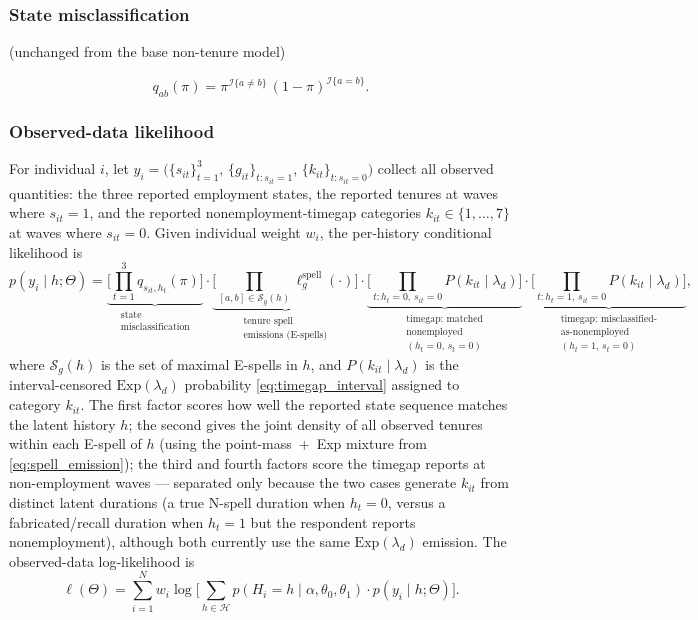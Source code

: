 \subsubsection{State misclassification} (unchanged from the base non-tenure model)

\begin{equation}
q_{ab}(\pi) = \pi^{\mathcal{I}\{a \neq b\}}\,(1-\pi)^{\mathcal{I}\{a=b\}}.
\end{equation}

\subsubsection{Observed-data likelihood}

For individual \(i\), let
\(y_i = \big(\{s_{it}\}_{t=1}^3,\, \{g_{it}\}_{t:s_{it}=1},\,
\{k_{it}\}_{t:s_{it}=0}\big)\) collect all observed quantities: the
three reported employment states, the reported tenures at waves where
\(s_{it}=1\), and the reported nonemployment-timegap categories
\(k_{it} \in \{1,\dots,7\}\) at waves where \(s_{it}=0\).
Given individual weight \(w_i\), the per-history conditional likelihood is
\begin{equation}
p(y_i \mid h; \Theta) =
\underbrace{\Big[\prod_{t=1}^3 q_{s_{it},h_t}(\pi)\Big]}_{\substack{\text{state}\\\text{misclassification}}} \cdot
\underbrace{\Big[\prod_{[a,b] \in \mathcal{S}_g(h)} \ell^{\mathrm{spell}}_g(\cdot)\Big]}_{\substack{\text{tenure spell}\\\text{emissions (E-spells)}}} \cdot
\underbrace{\Big[\prod_{t : h_t=0,\,s_{it}=0} P(k_{it} \mid \lambda_d)\Big]}_{\substack{\text{timegap: matched}\\\text{nonemployed}\\(h_t{=}0,\,s_t{=}0)}} \cdot
\underbrace{\Big[\prod_{t : h_t=1,\,s_{it}=0} P(k_{it} \mid \lambda_d)\Big]}_{\substack{\text{timegap: misclassified-}\\\text{as-nonemployed}\\(h_t{=}1,\,s_t{=}0)}},
\end{equation}
where \(\mathcal{S}_g(h)\) is the set of maximal E-spells in \(h\), and
\(P(k_{it} \mid \lambda_d)\) is the interval-censored
\(\mathrm{Exp}(\lambda_d)\) probability \eqref{eq:timegap_interval}
assigned to category \(k_{it}\). The first factor scores how well the
reported state sequence matches the latent history \(h\); the second
gives the joint density of all observed tenures within each E-spell of
\(h\) (using the point-mass~+~Exp mixture from \eqref{eq:spell_emission});
the third and fourth factors score the timegap reports at non-employment
waves --- separated only because the two cases generate \(k_{it}\) from
distinct latent durations (a true N-spell duration when \(h_t = 0\),
versus a fabricated/recall duration when \(h_t = 1\) but the respondent
reports nonemployment), although both currently use the same
\(\mathrm{Exp}(\lambda_d)\) emission. The
observed-data log-likelihood is
\begin{equation}
\ell(\Theta) = \sum_{i=1}^N w_i \log\bigg[\sum_{h \in \mathcal{H}} p(H_i = h \mid \alpha,\theta_0,\theta_1) \cdot p(y_i \mid h; \Theta)\bigg].
\end{equation}

